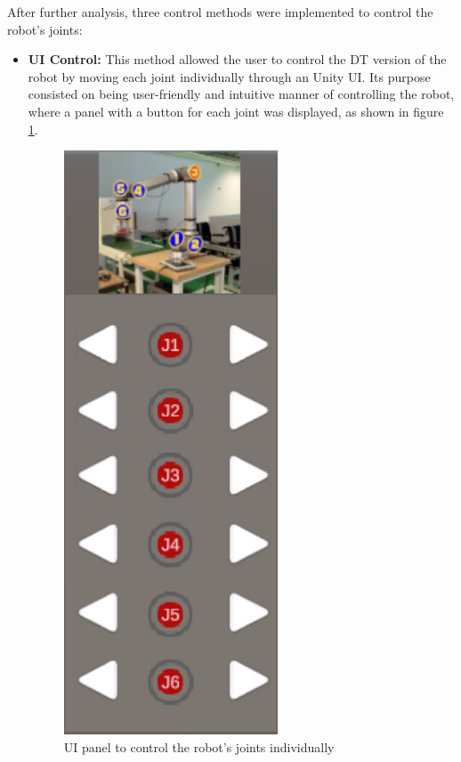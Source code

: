 After further analysis, three control methods were implemented to control the robot's joints:
\begin{itemize}
    \item \textbf{UI Control:} This method allowed the user to control the \ac{DT} version of the robot by moving each joint individually through an Unity \ac{UI}. Its purpose consisted on being user-friendly and intuitive manner of controlling the robot, where a panel with a button for each joint was displayed, as shown in figure \ref{f:ui-control}. 
    
    \begin{figure}[h]
        \centering
        \includegraphics[width=0.6\textwidth]{figs/toggle-1.png}
        \caption{\ac{UI} panel to control the robot's joints individually}
        \label{f:ui-control}
    \end{figure}


\end{itemize}
